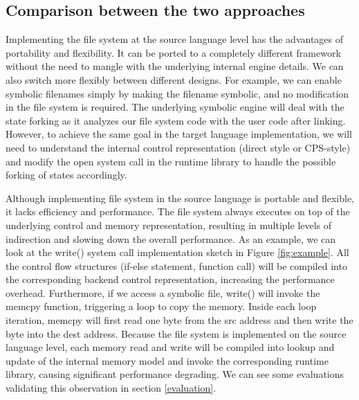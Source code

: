 \documentclass[sigplan, nonacm]{acmart}\settopmatter{printfolios=true,printccs=false,printacmref=false}
\begin{document}
\subsection*{Comparison between the two approaches}
Implementing the file system at the source language level has the advantages of portability and flexibility. It can be ported to a completely different framework without the need to mangle with the underlying internal engine details. We can also switch more flexibly between different designs. For example, we can enable symbolic filenames simply by making the filename symbolic, and no modification in the file system is required. The underlying symbolic engine will deal with the state forking as it analyzes our file system code with the user code after linking. However, to achieve the same goal in the target language implementation, we will need to understand the internal control representation (direct style or CPS-style) and modify the open system call in the runtime library to handle the possible forking of states accordingly.\par
Although implementing file system in the source language is portable and flexible, it lacks efficiency and performance. The file system always executes on top of the underlying control and memory representation, resulting in multiple levels of indirection and slowing down the overall performance. As an example, we can look at the write() system call implementation sketch in Figure \ref{fig:example}. All the control flow structures (if-else statement, function call) will be compiled into the corresponding backend control representation, increasing the performance overhead. Furthermore, if we access a symbolic file, write() will invoke the memcpy function, triggering a loop to copy the memory. Inside each loop iteration, memcpy will first read one byte from the src address and then write the byte into the dest address. Because the file system is implemented on the source language level, each memory read and write will be compiled into lookup and update of the internal memory model and invoke the corresponding runtime library, causing significant performance degrading. We can see some evaluations validating this observation in section \ref{evaluation}.
\end{document}
